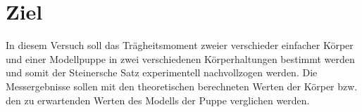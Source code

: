 \section{Ziel}
In diesem Versuch soll das Trägheitsmoment zweier verschieder einfacher Körper
und einer Modellpuppe in zwei verschiedenen Körperhaltungen bestimmt werden und
somit der Steinersche Satz experimentell nachvollzogen werden.
Die Messergebnisse sollen mit den theoretischen berechneten Werten der Körper bzw.
den zu erwartenden Werten des Modells der Puppe verglichen werden.
\label{sec:Ziel}
